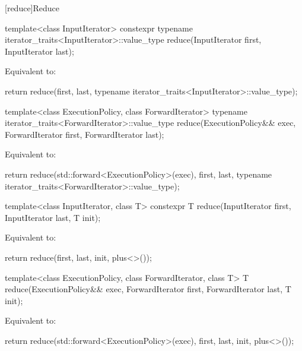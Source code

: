 [reduce]{Reduce}

%
\begin{itemdecl}
template<class InputIterator>
  constexpr typename iterator_traits<InputIterator>::value_type
    reduce(InputIterator first, InputIterator last);
\end{itemdecl}

\begin{itemdescr}
\pnum
\effects
Equivalent to:
\begin{codeblock}
return reduce(first, last,
              typename iterator_traits<InputIterator>::value_type{});
\end{codeblock}
\end{itemdescr}

%
\begin{itemdecl}
template<class ExecutionPolicy, class ForwardIterator>
  typename iterator_traits<ForwardIterator>::value_type
    reduce(ExecutionPolicy&& exec,
           ForwardIterator first, ForwardIterator last);
\end{itemdecl}

\begin{itemdescr}
\pnum
\effects
Equivalent to:
\begin{codeblock}
return reduce(std::forward<ExecutionPolicy>(exec), first, last,
              typename iterator_traits<ForwardIterator>::value_type{});
\end{codeblock}
\end{itemdescr}


%
\begin{itemdecl}
template<class InputIterator, class T>
  constexpr T reduce(InputIterator first, InputIterator last, T init);
\end{itemdecl}

\begin{itemdescr}
\pnum
\effects
Equivalent to:
\begin{codeblock}
return reduce(first, last, init, plus<>());
\end{codeblock}
\end{itemdescr}

%
\begin{itemdecl}
template<class ExecutionPolicy, class ForwardIterator, class T>
  T reduce(ExecutionPolicy&& exec,
           ForwardIterator first, ForwardIterator last, T init);
\end{itemdecl}

\begin{itemdescr}
\pnum
\effects
Equivalent to:
\begin{codeblock}
return reduce(std::forward<ExecutionPolicy>(exec), first, last, init, plus<>());
\end{codeblock}
\end{itemdescr}


